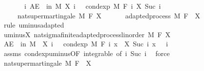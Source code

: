 \begin{isabellebody}
\ \ \ \ \ \ \ {\isachardoublequoteopen}{\isasymAnd}i{\isachardot}{\kern0pt}\ AE\ {\isasymxi}\ in\ M{\isachardot}{\kern0pt}\ X\ i\ {\isasymxi}\ {\isasymge}\ cond{\isacharunderscore}{\kern0pt}exp\ M\ {\isacharparenleft}{\kern0pt}F\ i{\isacharparenright}{\kern0pt}\ {\isacharparenleft}{\kern0pt}X\ {\isacharparenleft}{\kern0pt}Suc\ i{\isacharparenright}{\kern0pt}{\isacharparenright}{\kern0pt}\ {\isasymxi}{\isachardoublequoteclose}\ \isanewline
\ \ \ \ \ {\isachardoublequoteopen}nat{\isacharunderscore}{\kern0pt}supermartingale\ M\ F\ X{\isachardoublequoteclose}\isanewline
%
\isadelimproof
%
\endisadelimproof
%
\isatagproof
{}\isamarkupfalse%
\ {\isacharminus}{\kern0pt}\isanewline
\ \ \isamarkupfalse%
\ {\isacharunderscore}{\kern0pt}{\isacharcolon}{\kern0pt}\ adapted{\isacharunderscore}{\kern0pt}process\ M\ F\ {}\ {\isachardoublequoteopen}{\isacharminus}{\kern0pt}X{\isachardoublequoteclose}\ \isamarkupfalse%
\ {\isacharparenleft}{\kern0pt}rule\ uminus{\isacharunderscore}{\kern0pt}adapted{\isacharparenright}{\kern0pt}\isanewline
\ \ \isamarkupfalse%
\ uminus{\isacharunderscore}{\kern0pt}X{\isacharcolon}{\kern0pt}\ nat{\isacharunderscore}{\kern0pt}sigma{\isacharunderscore}{\kern0pt}finite{\isacharunderscore}{\kern0pt}adapted{\isacharunderscore}{\kern0pt}process{\isacharunderscore}{\kern0pt}linorder\ M\ F\ {\isachardoublequoteopen}{\isacharminus}{\kern0pt}X{\isachardoublequoteclose}\ \isacommand{{\isachardot}{\kern0pt}{\isachardot}{\kern0pt}}\isamarkupfalse%
\isanewline
\ \ \isamarkupfalse%
\ {\isachardoublequoteopen}AE\ {\isasymxi}\ in\ M{\isachardot}{\kern0pt}\ {\isacharminus}{\kern0pt}\ X\ i\ {\isasymxi}\ {\isasymle}\ cond{\isacharunderscore}{\kern0pt}exp\ M\ {\isacharparenleft}{\kern0pt}F\ i{\isacharparenright}{\kern0pt}\ {\isacharparenleft}{\kern0pt}{\isasymlambda}x{\isachardot}{\kern0pt}\ {\isacharminus}{\kern0pt}\ X\ {\isacharparenleft}{\kern0pt}Suc\ i{\isacharparenright}{\kern0pt}\ x{\isacharparenright}{\kern0pt}\ {\isasymxi}{\isachardoublequoteclose}\ \ i\ \isamarkupfalse%
\ assms{\isacharparenleft}{\kern0pt}{}{\isacharparenright}{\kern0pt}\ cond{\isacharunderscore}{\kern0pt}exp{\isacharunderscore}{\kern0pt}uminus{\isacharbrackleft}{\kern0pt}OF\ integrable{\isacharcomma}{\kern0pt}\ of\ i\ {\isachardoublequoteopen}Suc\ i{\isachardoublequoteclose}{\isacharbrackright}{\kern0pt}\ \isamarkupfalse%
\ force\isanewline
\ \ \isamarkupfalse%
\ {\isachardoublequoteopen}nat{\isacharunderscore}{\kern0pt}supermartingale\ M\ F\ {\isacharparenleft}{\kern0pt}{\isacharminus}{\kern0pt}{\isacharparenleft}{\kern0pt}{\isacharminus}{\kern0pt}\ X{\isacharparenright}{\kern0pt}{\isacharparenright}{\kern0pt}{\isachardoublequoteclose}\ \isamarkupfalse%

\end{isabellebody}
